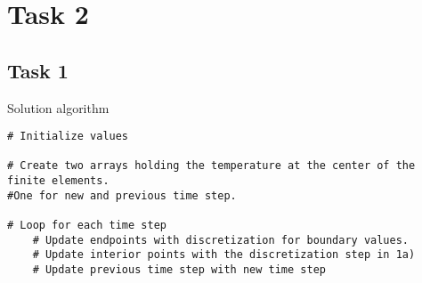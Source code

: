 \documentclass{article}
\begin{document}
\section*{Task 2}

\subsection*{Task 1}

Solution algorithm

\begin{lstlisting}
# Initialize values

# Create two arrays holding the temperature at the center of the finite elements. 
#One for new and previous time step.

# Loop for each time step
	# Update endpoints with discretization for boundary values.
	# Update interior points with the discretization step in 1a)
	# Update previous time step with new time step
\end{lstlisting}
\end{document}
